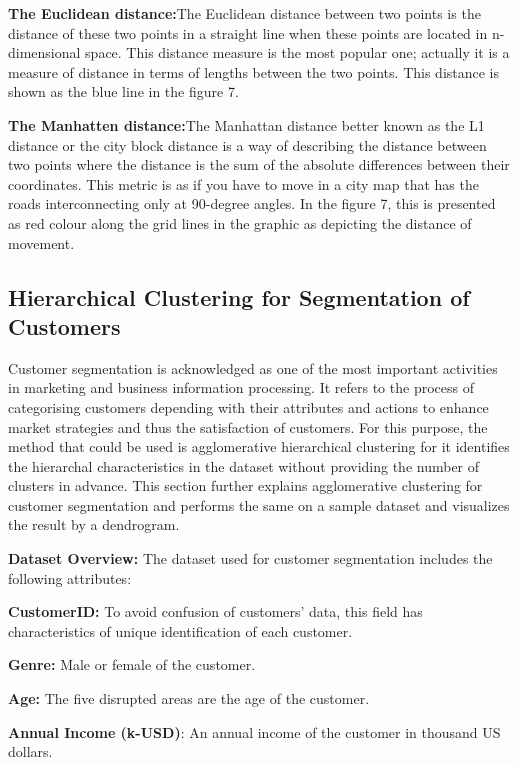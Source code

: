 \documentclass[conference]{IEEEtran}
\begin{document}
\textbf{The  Euclidean distance:}The Euclidean distance between two points is the distance of these two points in a straight line when these points are located in n-dimensional space. This distance measure is the most popular one; actually it is a measure of distance in terms of lengths between the two points.\cite{yim2015hierarchical} This distance is shown as the blue line in the figure 7.

\textbf{The Manhatten distance:}The Manhattan distance better known as the L1 distance or the city block distance is a way of describing the distance between two points where the distance is the sum of the absolute differences between their coordinates. This metric is as if you have to move in a city map that has the roads interconnecting only at 90-degree angles.\cite{yim2015hierarchical} In the figure 7, this is presented as red colour along the grid lines in the graphic as depicting the distance of movement.

\subsection{Hierarchical Clustering for Segmentation of Customers} Customer segmentation is acknowledged as one of the most important activities in marketing and business information processing. It refers to the process of categorising customers depending with their attributes and actions to enhance market strategies and thus the satisfaction of customers. For this purpose, the method that could be used is agglomerative hierarchical clustering for it identifies the hierarchal characteristics in the dataset without providing the number of clusters in advance. This section further explains agglomerative clustering for customer segmentation and performs the same on a sample dataset and visualizes the result by a dendrogram.\cite{salvador2004determining}

\textbf{Dataset Overview:} The dataset used for customer segmentation includes the following attributes:

\textbf{CustomerID:} To avoid confusion of customers’ data, this field has characteristics of unique identification of each customer.

\textbf{Genre:} Male or female of the customer.

\textbf{Age: }The five disrupted areas are the age of the customer.

\textbf{Annual Income (k-USD)}: An annual income of the customer in thousand US dollars.
\end{document}
